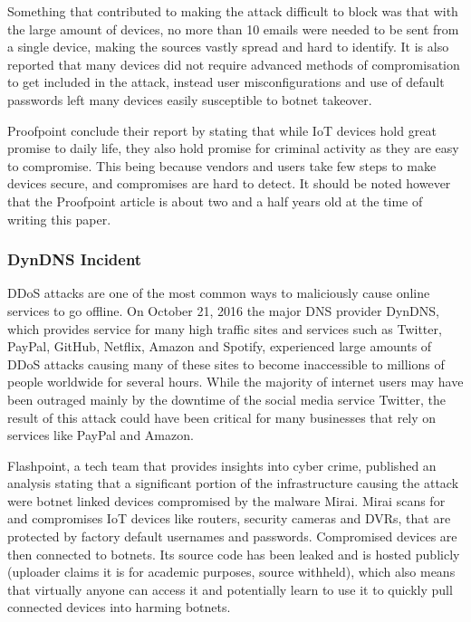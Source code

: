 \documentclass[a4paper, conference]{IEEEtran/IEEEtran}
\begin{document}
Something that contributed to making the attack difficult to block was that with the large amount of devices, no more than 10 emails were needed to be sent from a single device, making the sources vastly spread and hard to identify.\cite{proofpoint} It is also reported that many devices did not require advanced methods of compromisation to get included in the attack, instead user misconfigurations and use of default passwords left many devices easily susceptible to botnet takeover. 

Proofpoint conclude their report by stating that while IoT devices hold great promise to daily life, they also hold promise for criminal activity as they are easy to compromise. This being because vendors and users take few steps to make devices secure, and compromises are hard to detect.\cite{proofpoint} It should be noted however that the Proofpoint article is about two and a half years old at the time of writing this paper. %

\subsubsection{DynDNS Incident}
DDoS attacks are one of the most common ways to maliciously cause online services to go offline. On October 21, 2016 the major DNS provider DynDNS, which provides service for many high traffic sites and services such as Twitter, PayPal, GitHub, Netflix, Amazon and Spotify, experienced large amounts of DDoS attacks causing many of these sites to become inaccessible to millions of people worldwide for several hours.\cite{dynstatement} While the majority of internet users may have been outraged mainly by the downtime of the social media service Twitter, the result of this attack could have been critical for many businesses that rely on services like PayPal and Amazon.

Flashpoint, a tech team that provides insights into cyber crime,\cite{flashpoint} published an analysis stating that a significant portion of the infrastructure causing the attack were botnet linked devices compromised by the malware Mirai.\cite{fpmirai} Mirai scans for and compromises IoT devices like routers, security cameras and DVRs, that are protected by factory default usernames and passwords. Compromised devices are then connected to botnets. Its source code has been leaked and is hosted publicly (uploader claims it is for academic purposes, source withheld), which also means that virtually anyone can access it and potentially learn to use it to quickly pull connected devices into harming botnets.
\end{document}
